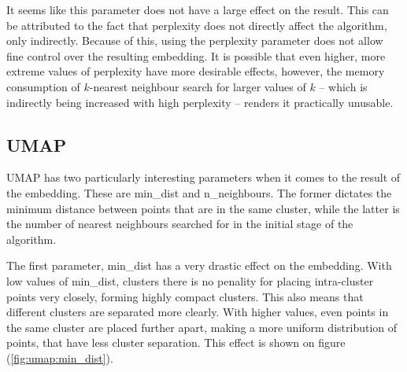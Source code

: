 It seems like this parameter does not have a large effect on the result. This can be attributed to the fact that perplexity does not directly affect the algorithm, only indirectly. Because of this, using the perplexity parameter does not allow fine control over the resulting embedding. It is possible that even higher, more extreme values of perplexity have more desirable effects, however, the memory consumption of $k$-nearest neighbour search for larger values of $k$ -- which is indirectly being increased with high perplexity -- renders it practically unusable.

\subsection{UMAP}


UMAP has two particularly interesting parameters when it comes to the result of the embedding. These are min\_dist and n\_neighbours. The former dictates the minimum distance between points that are in the same cluster, while the latter is the number of nearest neighbours searched for in the initial stage of the algorithm. 

The first parameter, min\_dist has a very drastic effect on the embedding. With low values of min\_dist, clusters there is no penality for placing intra-cluster points very closely, forming  highly compact clusters. This also means that different clusters are separated more clearly. With higher values, even points in the same cluster are placed further apart, making a more uniform distribution of points, that have less cluster separation. This effect is shown on figure (\ref{fig:umap:min_dist}). 

